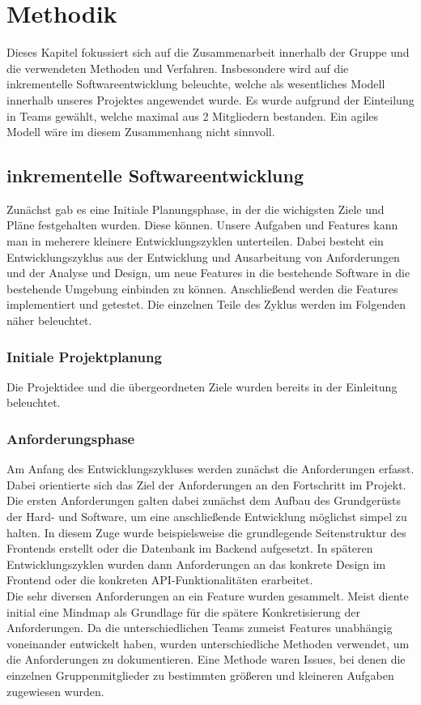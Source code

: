 \section{Methodik}
    \label{sec:methodik}

    Dieses Kapitel fokussiert sich auf die Zusammenarbeit innerhalb der Gruppe und die verwendeten Methoden und 
    Verfahren. Insbesondere wird auf die inkrementelle Softwareentwicklung beleuchte, welche als wesentliches 
    Modell innerhalb unseres Projektes angewendet wurde. Es wurde aufgrund der Einteilung in Teams gewählt, welche
    maximal aus 2 Mitgliedern bestanden. Ein agiles Modell wäre im diesem Zusammenhang nicht sinnvoll. 

    \subsection*{inkrementelle Softwareentwicklung} 
    Zunächst gab es eine Initiale Planungsphase, in der die wichigsten Ziele und Pläne festgehalten wurden. 
    Diese können. Unsere Aufgaben und Features kann man in meherere kleinere Entwicklungszyklen unterteilen. 
    Dabei besteht ein Entwicklungszyklus aus der Entwicklung und Ausarbeitung von Anforderungen und 
    der Analyse und Design, um neue Features in die bestehende Software in die bestehende Umgebung
    einbinden zu können. Anschließend werden die Features implementiert und getestet. 
    Die einzelnen Teile des Zyklus werden im Folgenden näher beleuchtet.
        \subsubsection*{Initiale Projektplanung}
        Die Projektidee und die übergeordneten Ziele wurden bereits in der Einleitung beleuchtet. 
        \subsubsection*{Anforderungsphase} 
        Am Anfang des Entwicklungszykluses werden zunächst die Anforderungen erfasst. Dabei orientierte 
        sich das Ziel der Anforderungen an den Fortschritt im Projekt. Die ersten Anforderungen galten dabei 
        zunächst dem Aufbau des Grundgerüsts der Hard- und Software, um eine anschließende Entwicklung
        möglichst simpel zu halten. In diesem Zuge wurde beispielsweise die grundlegende Seitenstruktur des 
        Frontends erstellt oder die Datenbank im Backend aufgesetzt. In späteren Entwicklungszyklen wurden 
        dann Anforderungen an das konkrete Design im Frontend oder die konkreten API-Funktionalitäten erarbeitet.\\
        Die sehr diversen Anforderungen an ein Feature wurden gesammelt. Meist diente initial eine Mindmap als 
        Grundlage für die spätere Konkretisierung der Anforderungen. Da die unterschiedlichen Teams zumeist 
        Features unabhängig voneinander entwickelt haben, wurden unterschiedliche Methoden verwendet, um die
        Anforderungen zu dokumentieren. Eine Methode waren Issues, bei denen die einzelnen Gruppenmitglieder 
        zu bestimmten größeren und kleineren Aufgaben zugewiesen wurden. 

